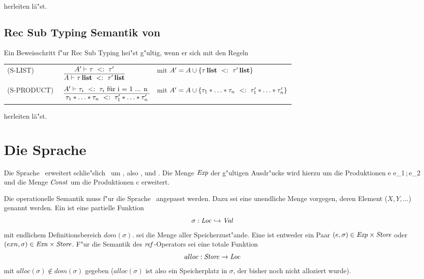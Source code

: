 herleiten l\"a"st.

\subsection{Rec Sub Typing Semantik von \LTHREESUB}

Ein Beweisschritt f"ur Rec Sub Typing hei"st g"ultig, wenn er sich mit den Regeln  \\[5mm]
 \begin{tabular}{lll}
    \mbox{(S-LIST)\ }      & $\RULE{A' \vdash \subtype{\tau} {\tau'} }
                              {A \vdash \subtype{\listtype{\tau}} {\listtype{\tau'}}}$ 
				& mit $A' = A \cup \{\tau\,\textbf{list}\ <:\ \tau'\,\textbf{list}\}$ \\[4mm]
    \mbox{(S-PRODUCT)\ }      & $\RULE{A' \vdash \subtype{\tau_i} {\tau_i} \text{ f\"ur  i = 1 ... n }}
                              {\subtype{\tau_1 * \ldots * \tau_n} {\tau_1' * \ldots * \tau_n'}}$ 
				& mit $A' = A \cup \{\tau_1 * \ldots * \tau_n\ <:\ \tau_1' * \ldots * \tau_n'\}$ \\[4mm]
          \end{tabular}


herleiten l\"a"st.


\section{Die Sprache \LFOUR}

Die Sprache \LFOUR\ erweitert schlie"slich \LTHREE\ um , also ,  und
. Die Menge ${\text{\it Exp\/}}$ der g"ultigen Ausdr"ucke wird hierzu um die Produktionen
\bgram
e \is {}
  \al {}
  \al e_1\,;\,e_2
\egram
und die Menge ${\text{\it Const\/}}$ um die Produktionen 
\bgram
c \is \Ref \mid \Deref \mid \Assign
\egram
erweitert.

Die operationelle Semantik muss f"ur die Sprache \LFOUR\ angepasst werden. Dazu sei eine unendliche Menge \notation{$\Loc$} vorgegen,
deren Element ($X, Y, \ldots$)   genannt werden. Ein 
 ist eine partielle Funktion
\[
  \sigma: {\text{\it Loc\/}} \hookrightarrow {\text{\it Val\/}}
\]
mit endlichem Definitionsbereich $dom(\sigma)$.
 sei die Menge aller Speicherzust"ande. Eine  ist entweder ein Paar
$(e,\sigma) \in {\text{\it Exp\/}} \times {\text{\it Store\/}}$ oder $(exn, \sigma) \in {\text{\it Exn\/}} \times {\text{\it Store\/}}$. F"ur die Semantik des
${\text{\it ref\/}}$-Operators sei eine totale Funktion
\[
  alloc: {\text{\it Store\/}} \to {\text{\it Loc\/}}
\]
mit $alloc(\sigma) \not\in dom(\sigma)$ gegeben ($alloc(\sigma)$ ist also ein Speicherplatz in $\sigma$,
der bisher noch nicht alloziert wurde).


